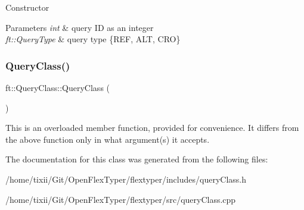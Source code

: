 Constructor 
\begin{DoxyParams}{Parameters}
{\em int} & query ID as an integer \\
\hline
{\em ft\+::\+Query\+Type} & query type \{R\+EF, A\+LT, C\+RO\} \\
\hline
\end{DoxyParams}
\mbox{\label{classft_1_1QueryClass_a9fdd93df1f397146c31e4c0bd16bf7e2}} 
\subsubsection{\texorpdfstring{Query\+Class()}{QueryClass()}\hspace{0.1cm}{\footnotesize\ttfamily [2/2]}}
{\footnotesize\ttfamily ft\+::\+Query\+Class\+::\+Query\+Class (\begin{DoxyParamCaption}{ }\end{DoxyParamCaption})}

This is an overloaded member function, provided for convenience. It differs from the above function only in what argument(s) it accepts. 

The documentation for this class was generated from the following files\+:\begin{DoxyCompactItemize}
\item 
/home/tixii/\+Git/\+Open\+Flex\+Typer/flextyper/includes/query\+Class.\+h\item 
/home/tixii/\+Git/\+Open\+Flex\+Typer/flextyper/src/query\+Class.\+cpp\end{DoxyCompactItemize}
